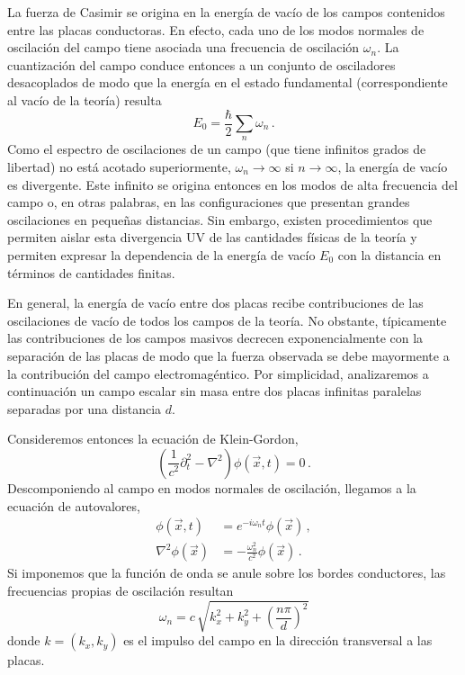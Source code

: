La fuerza de Casimir se origina en la energía de vacío de los campos contenidos entre las placas conductoras. En efecto, cada uno de los modos normales de oscilación del campo tiene asociada una frecuencia de oscilación $\omega_n$. La cuantización del campo conduce entonces a un conjunto de osciladores desacoplados de modo que la energía en el estado fundamental (correspondiente al vacío de la teoría) resulta
\begin{equation}
E _0 = \frac{\hbar}{2} \sum _n \omega _n\,.
\label{eq.casimir.div}
\end{equation}
Como el espectro de oscilaciones de un campo (que tiene infinitos grados de libertad) no está acotado superiormente, $\omega_n\to\infty$ si $n\to\infty$, la energía de vacío es divergente. Este infinito se origina entonces en los modos de alta frecuencia del campo o, en otras palabras, en las configuraciones que presentan grandes oscilaciones en pequeñas distancias. Sin embargo, existen procedimientos que permiten aislar esta divergencia UV de las cantidades físicas de la teoría y permiten expresar la dependencia de la energía de vacío $E_0$ con la distancia en términos de cantidades finitas.

En general, la energía de vacío entre dos placas recibe contribuciones de las oscilaciones de vacío de todos los campos de la teoría. No obstante, típicamente las contribuciones de los campos masivos decrecen exponencialmente con la separación de las placas de modo que la fuerza observada se debe mayormente a la contribución del campo electromagéntico. Por simplicidad, analizaremos a continuación un campo escalar sin masa entre dos placas infinitas paralelas separadas por una distancia $d$.

Consideremos entonces la ecuación de Klein-Gordon,
\begin{equation}
\left( \frac{1}{c^2} \partial _t ^2 - \nabla  ^2  \right) \phi (\vec{x} ,t) = 0 \,.
\end{equation}
Descomponiendo al campo en modos normales de oscilación, llegamos a la ecuación de autovalores,
\begin{align}
\phi ( \vec{x},t) &= e ^{-i \omega _n t} \phi ( \vec{x}) \,,\\
\nabla ^2 \phi ( \vec{x}) &= - \frac{\omega _n ^2}{c ^2} \phi ( \vec{x})\,.
\end{align}
Si imponemos que la función de onda se anule sobre los bordes conductores, las frecuencias propias de oscilación resultan
\begin{equation}
\omega _n = c\, \sqrt{ k _x ^2 + k _y ^2 + \left( \frac{n \pi}{d} \right) ^2 }
\end{equation}
donde $k=(k_x,k_y)$ es el impulso del campo en la dirección transversal a las placas.

